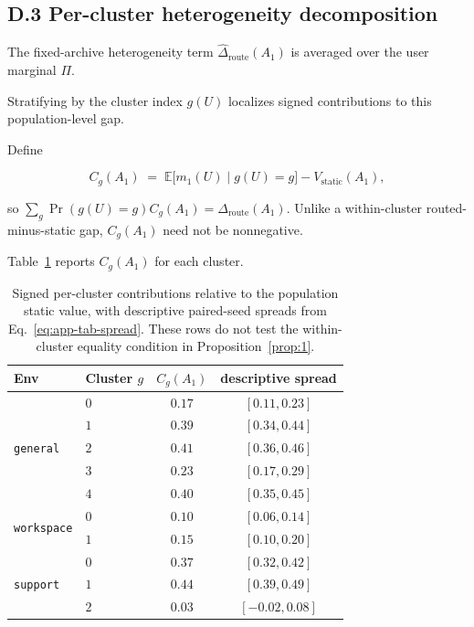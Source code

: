 \documentclass{article} %
\begin{document}
\subsection{D.3 Per-cluster heterogeneity decomposition}

\label{app:tab-cluster}

The fixed-archive heterogeneity term $\widehat\Delta_{\mathrm{route}}(A_1)$ is averaged over the user marginal $\Pi$.

Stratifying by the cluster index \(g(U)\) localizes signed contributions to
this population-level gap.

Define

\begin{equation}
\label{eq:app-tab-clustergap}
C_g(A_1)
\;=\;
\mathbb{E}\big[m_1(U)\mid g(U)=g\big]
- V_{\mathrm{static}}(A_1),
\end{equation}

so \(\sum_g\Pr(g(U)=g)C_g(A_1)=\Delta_{\mathrm{route}}(A_1)\).
Unlike a within-cluster routed-minus-static gap, \(C_g(A_1)\) need not be
nonnegative.

Table~\ref{tab:app-cluster} reports \(C_g(A_1)\) for each cluster.

\begin{table}[h]
\centering
\small
\begin{tabular}{llcc}
\toprule
Env & Cluster $g$ & $C_g(A_1)$ & descriptive spread \\
\midrule
\multirow{5}{*}{\texttt{general}}
 & $0$ & $0.17$ & $[0.11, 0.23]$ \\
 & $1$ & $0.39$ & $[0.34, 0.44]$ \\
 & $2$ & $0.41$ & $[0.36, 0.46]$ \\
 & $3$ & $0.23$ & $[0.17, 0.29]$ \\
 & $4$ & $0.40$ & $[0.35, 0.45]$ \\
\midrule
\multirow{2}{*}{\texttt{workspace}}
 & $0$ & $0.10$ & $[0.06, 0.14]$ \\
 & $1$ & $0.15$ & $[0.10, 0.20]$ \\
\midrule
\multirow{3}{*}{\texttt{support}}
 & $0$ & $0.37$ & $[0.32, 0.42]$ \\
 & $1$ & $0.44$ & $[0.39, 0.49]$ \\
 & $2$ & $0.03$ & $[-0.02, 0.08]$ \\
\bottomrule
\end{tabular}
\caption{Signed per-cluster contributions relative to the population static
value, with descriptive paired-seed spreads from
Eq.~\eqref{eq:app-tab-spread}.
These rows do not test the within-cluster equality condition in
Proposition~\ref{prop:1}.}
\label{tab:app-cluster}
\end{table}
\end{document}
